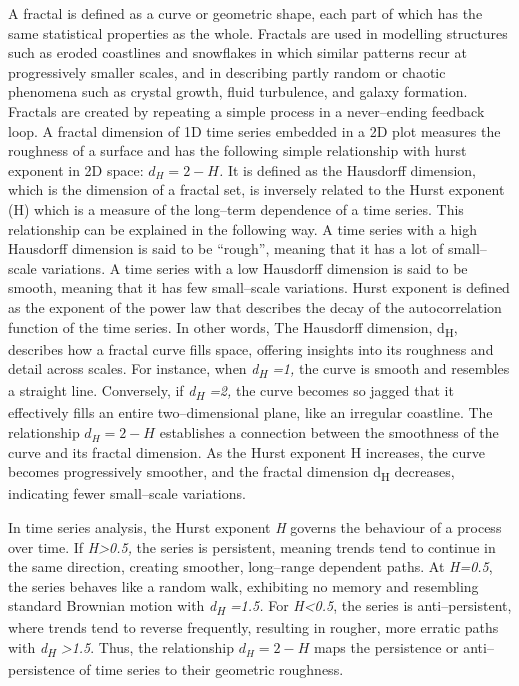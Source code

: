 \documentclass[12pt,a4paper]{report}
\numberwithin{equation}{section}
\begin{document}
A fractal is defined as a curve or geometric shape, each part of which
has the same statistical properties as the whole. Fractals are used in
modelling structures such as eroded coastlines and snowflakes in which
similar patterns recur at progressively smaller scales, and in
describing partly random or chaotic phenomena such as crystal growth,
fluid turbulence, and galaxy formation. Fractals are created by
repeating a simple process in a never--ending feedback loop. A fractal
dimension of 1D time series embedded in a 2D plot measures the roughness
of a surface and has the following simple relationship with hurst
exponent in 2D space: \(d_{H} = 2 - H\)\emph{.} It is defined as the
Hausdorff dimension, which is the dimension of a fractal set, is
inversely related to the Hurst exponent (H) which is a measure of the
long--term dependence of a time series. This relationship can be
explained in the following way. A time series with a high Hausdorff
dimension is said to be ``rough'', meaning that it has a lot of
small--scale variations. A time series with a low Hausdorff dimension is
said to be smooth, meaning that it has few small--scale variations. Hurst
exponent is defined as the exponent of the power law that describes the
decay of the autocorrelation function of the time series. In other
words, The Hausdorff dimension, d\textsubscript{H}, describes how a
fractal curve fills space, offering insights into its roughness and
detail across scales. For instance, when \emph{d\textsubscript{H} =1,}
the curve is smooth and resembles a straight line. Conversely, if
\emph{d\textsubscript{H} =2,} the curve becomes so jagged that it
effectively fills an entire two--dimensional plane, like an irregular
coastline. The relationship \(d_{H} = 2 - H\) establishes a connection
between the smoothness of the curve and its fractal dimension. As the
Hurst exponent H increases, the curve becomes progressively smoother,
and the fractal dimension d\textsubscript{H} decreases, indicating
fewer small--scale variations.

In time series analysis, the Hurst exponent \emph{H} governs the
behaviour of a process over time. If \emph{H\textgreater0.5,} the series
is persistent, meaning trends tend to continue in the same direction,
creating smoother, long--range dependent paths. At \emph{H=0.5}, the
series behaves like a random walk, exhibiting no memory and resembling
standard Brownian motion with \emph{d\textsubscript{H} =1.5.} For
\emph{H\textless0.5}, the series is anti--persistent, where trends tend
to reverse frequently, resulting in rougher, more erratic paths with
\emph{d\textsubscript{H} \textgreater1.5}. Thus, the relationship
\(d_{H} = 2 - H\) maps the persistence or anti--persistence of time
series to their geometric roughness.
\end{document}
